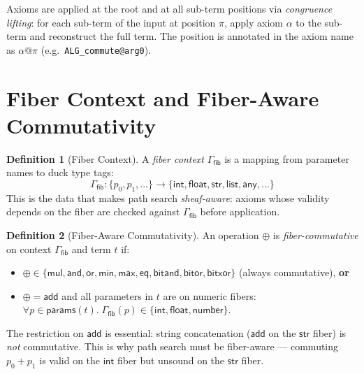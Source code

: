 \documentclass[11pt,a4paper]{report}
\theoremstyle{definition}
\newtheorem{definition}{Definition}[chapter]
\theoremstyle{plain}
\begin{document}
\noindent
Axioms are applied at the root and at all sub-term positions via
\emph{congruence lifting}: for each sub-term of the input at
position $\pi$, apply axiom $\alpha$ to the sub-term and reconstruct
the full term.  The position is annotated in the axiom name as
$\alpha\texttt{@}\pi$ (e.g.\ \texttt{ALG\_commute@arg0}).

\section{Fiber Context and Fiber-Aware Commutativity}
\label{sec:fiber-ctx}

\begin{definition}[Fiber Context]
\label{def:fiber-ctx}
A \emph{fiber context} $\Gamma_{\mathsf{fib}}$ is a mapping from
parameter names to duck type tags:
\[
  \Gamma_{\mathsf{fib}} : \{p_0, p_1, \ldots\}
  \longrightarrow \{\mathsf{int}, \mathsf{float}, \mathsf{str},
  \mathsf{list}, \mathsf{any}, \ldots\}
\]
This is the data that makes path search \emph{sheaf-aware}:
axioms whose validity depends on the fiber are checked against
$\Gamma_{\mathsf{fib}}$ before application.
\end{definition}

\begin{definition}[Fiber-Aware Commutativity]
\label{def:fiber-commutativity}
An operation $\oplus$ is \emph{fiber-commutative} on context
$\Gamma_{\mathsf{fib}}$ and term $t$ if:
\begin{itemize}
  \item $\oplus \in \{\mathsf{mul}, \mathsf{and}, \mathsf{or},
    \mathsf{min}, \mathsf{max}, \mathsf{eq}, \mathsf{bitand},
    \mathsf{bitor}, \mathsf{bitxor}\}$ (always commutative), \textbf{or}
  \item $\oplus = \mathsf{add}$ and all parameters in $t$ are on
    numeric fibers: $\forall p \in \mathsf{params}(t).\;
    \Gamma_{\mathsf{fib}}(p) \in \{\mathsf{int}, \mathsf{float},
    \mathsf{number}\}$.
\end{itemize}
The restriction on $\mathsf{add}$ is essential: string concatenation
($\mathsf{add}$ on the $\mathsf{str}$ fiber) is \emph{not}
commutative.  This is why path search must be fiber-aware ---
commuting $p_0 + p_1$ is valid on the $\mathsf{int}$ fiber but
unsound on the $\mathsf{str}$ fiber.
\end{definition}
\end{document}
